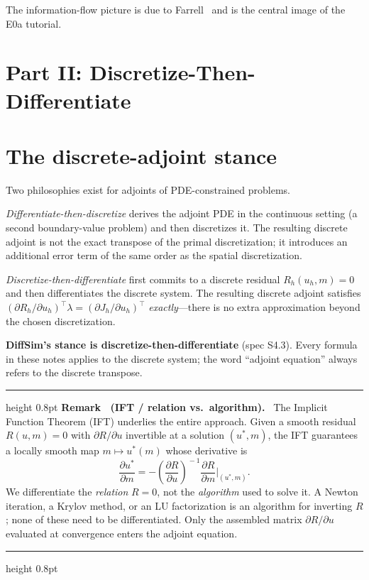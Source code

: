 \documentclass[11pt]{article}
\newcounter{remark}
\newenvironment{remark}[1]{%
  \refstepcounter{remark}\par\medskip
  \noindent\begin{minipage}{\linewidth}
  \hrule height 0.8pt \smallskip
  \textbf{Remark \theremark\ (#1).}\ }{%
  \smallskip\hrule height 0.8pt \end{minipage}\par\medskip}
\begin{document}
The information-flow picture is due to Farrell~\cite{farrell2013} and is
the central image of the E0a tutorial.

\section*{Part II: Discretize-Then-Differentiate}

\section{The discrete-adjoint stance}
\label{sec:dtd}

Two philosophies exist for adjoints of PDE-constrained problems.

\emph{Differentiate-then-discretize} derives the adjoint PDE in the
continuous setting (a second boundary-value problem) and then discretizes
it.  The resulting discrete adjoint is not the exact transpose of the
primal discretization; it introduces an additional error term of the same
order as the spatial discretization.

\emph{Discretize-then-differentiate} first commits to a discrete residual
$R_h(u_h, m) = 0$ and then differentiates the discrete system.  The
resulting discrete adjoint satisfies
$({\partial R_h}/{\partial u_h})^\top \lambda = ({\partial J_h}/
{\partial u_h})^\top$ \emph{exactly}---there is no extra approximation
beyond the chosen discretization.

\textbf{DiffSim's stance is discretize-then-differentiate} (spec S4.3).
Every formula in these notes applies to the discrete system; the word
``adjoint equation'' always refers to the discrete transpose.

\begin{remark}{IFT / relation vs.\ algorithm}
The Implicit Function Theorem (IFT) underlies the entire approach.
Given a smooth residual $R(u, m) = 0$ with $\partial R/\partial u$
invertible at a solution $(u^*, m)$, the IFT guarantees a locally smooth
map $m \mapsto u^*(m)$ whose derivative is
\begin{equation}
  \frac{\partial u^*}{\partial m}
  = -\!\left(\frac{\partial R}{\partial u}\right)^{\!-1}
    \frac{\partial R}{\partial m}\biggr|_{(u^*,m)} .
  \label{eq:ift}
\end{equation}
We differentiate the \emph{relation} $R = 0$, not the \emph{algorithm}
used to solve it.  A Newton iteration, a Krylov method, or an LU
factorization is an algorithm for inverting $R$; none of these need to
be differentiated.  Only the assembled matrix $\partial R/\partial u$
evaluated at convergence enters the adjoint equation.
\end{remark}
\end{document}
